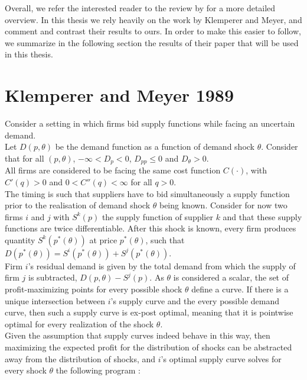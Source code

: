 Overall, we refer the interested reader to the review by \cite{ventosa2005electricity} for a more detailed overview. In this thesis we rely heavily on the work by Klemperer and Meyer, and comment and contrast their results to ours. In order to make this easier to follow, we summarize in the following section the results of their paper that will be used in this thesis.

\section*{Klemperer and Meyer 1989}
Consider a setting in which firms bid supply functions while facing an uncertain demand. \\

Let $D(p,\theta)$ be the demand function as a function of demand shock $\theta$. Consider that for all $(p,\theta)$, $-\infty<D_p<0$, $D_{pp}\leq 0$ and $D_\theta>0$.\\

All firms are considered to be facing the same cost function $C(\cdot)$, with $C'(q)>0$ and $0<C''(q)<\infty$ for all $q>0$.\\

The timing is such that suppliers have to bid simultaneously a supply function prior to the realisation of demand shock $\theta$ being known. Consider for now two firms $i$ and $j$ with $S^k(p)$ the supply function of supplier $k$ and that these supply functions are twice differentiable. After this shock is known, every firm produces quantity $S^k(p^*(\theta))$ at price $p^*(\theta)$, such that $D(p^*(\theta)) = S^i(p^*(\theta)) + S^j(p^*(\theta))$.\\

Firm $i$'s residual demand is given by the total demand from which the supply of firm $j$ is subtracted, $D(p,\theta) - S^j(p)$. As $\theta$ is considered a scalar, the set of profit-maximizing points for every possible shock $\theta$ define a curve. If there is a unique intersection between $i$'s supply curve and the every possible demand curve, then such a supply curve is ex-post optimal, meaning that it is pointwise optimal for every realization of the shock $\theta$. \\

Given the assumption that supply curves indeed behave in this way, then maximizing the expected profit for the distribution of shocks can be abstracted away from the distribution of shocks, and $i$'s optimal supply curve solves for every shock $\theta$ the following program :

